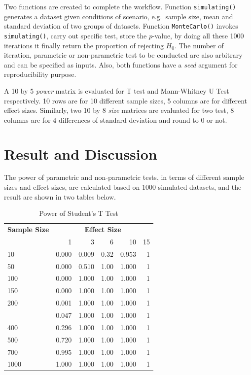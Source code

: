 \documentclass[]{article}
\begin{document}
Two functions are created to complete the workflow. Function
\texttt{simulating()} generates a dataset given conditions of scenario,
e.g.~sample size, mean and standard deviation of two groups of datasets.
Function \texttt{MonteCarlo()} invokes \texttt{simulating()}, carry out
specific test, store the \(p\)-value, by doing all these 1000 iterations
it finally return the proportion of rejecting \(H_0\). The number of
iteration, parametric or non-parametric test to be conducted are also
arbitrary and can be specified as inputs. Also, both functions have a
\emph{seed} argument for reproducibility purpose.

A 10 by 5 \emph{power} matrix is evaluated for T test and Mann-Whitney U
Test respectively. 10 rows are for 10 different sample sizes, 5 columns
are for different effect sizes. Similarly, two 10 by 8 \emph{size}
matrices are evaluated for two test, 8 columns are for 4 differences of
standard deviation and round to 0 or not.

\hypertarget{result-and-discussion}{%
\section{Result and Discussion}\label{result-and-discussion}}

The power of parametric and non-parametric tests, in terms of different
sample sizes and effect sizes, are calculated based on 1000 simulated
datasets, and the result are shown in two tables below.

\begin{longtable}[t]{lrrrrr}
\caption{\label{tab:power-tables}Power of Student's T Test}\\
\toprule
\multicolumn{1}{c}{\bfseries Sample Size} & \multicolumn{5}{c}{\bfseries Effect Size} \\
\cmidrule(l{2pt}r{2pt}){1-1} \cmidrule(l{2pt}r{2pt}){2-6}
  & 1 & 3 & 6 & 10 & 15\\
\midrule
10 & 0.000 & 0.009 & 0.32 & 0.953 & 1\\
50 & 0.000 & 0.510 & 1.00 & 1.000 & 1\\
100 & 0.000 & 1.000 & 1.00 & 1.000 & 1\\
150 & 0.000 & 1.000 & 1.00 & 1.000 & 1\\
200 & 0.001 & 1.000 & 1.00 & 1.000 & 1\\
\addlinespace
300 & 0.047 & 1.000 & 1.00 & 1.000 & 1\\
400 & 0.296 & 1.000 & 1.00 & 1.000 & 1\\
500 & 0.720 & 1.000 & 1.00 & 1.000 & 1\\
700 & 0.995 & 1.000 & 1.00 & 1.000 & 1\\
1000 & 1.000 & 1.000 & 1.00 & 1.000 & 1\\
\bottomrule
\end{longtable}
\end{document}
